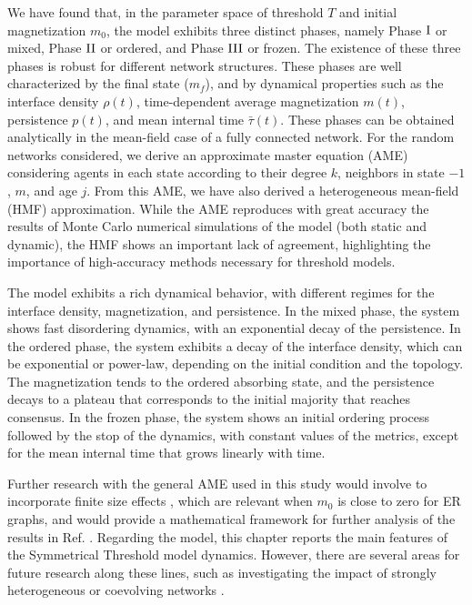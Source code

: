 We have found that, in the parameter space of threshold $T$ and initial magnetization $m_0$, the model exhibits three distinct phases, namely Phase ${\rm I}$ or mixed, Phase ${\rm II}$ or ordered, and Phase ${\rm III}$ or frozen. The existence of these three phases is robust for different network structures.
These phases are well characterized by the final state ($m_f$), and by dynamical properties such as the interface density $\rho(t)$, time-dependent average magnetization $m(t)$, persistence $p(t)$, and mean internal time $\bar{\tau}(t)$. These phases can be obtained analytically in the mean-field case of a fully connected network. For the random networks considered, we derive an approximate master equation (AME) \cite{gleeson-2013} considering agents in each state according to their degree $k$,  neighbors in state $-1$, $m$, and age $j$. From this AME, we have also derived a heterogeneous mean-field (HMF) approximation. While the AME reproduces with great accuracy the results of Monte Carlo numerical simulations of the model (both static and dynamic), the HMF shows an important lack of agreement, highlighting the importance of high-accuracy methods necessary for threshold models.

The model exhibits a rich dynamical behavior, with different regimes for the interface density, magnetization, and persistence. In the mixed phase, the system shows fast disordering dynamics, with an exponential decay of the persistence. In the ordered phase, the system exhibits a decay of the interface density, which can be exponential or power-law, depending on the initial condition and the topology. The magnetization tends to the ordered absorbing state, and the persistence decays to a plateau that corresponds to the initial majority that reaches consensus. In the frozen phase, the system shows an initial ordering process followed by the stop of the dynamics, with constant values of the metrics, except for the mean internal time that grows linearly with time.

Further research with the general AME used in this study would involve to incorporate finite size effects \cite{peralta-2020B}, which are relevant when $m_0$ is close to zero for ER graphs, and would provide a mathematical framework for further analysis of the results in Ref. \cite{Pournaki-2022}. Regarding the model, this chapter reports the main features of the Symmetrical Threshold model dynamics. However, there are several areas for future research along these lines, such as investigating the impact of strongly heterogeneous \cite{barabasi2009scale} or coevolving networks \cite{Zimmermann,vazquez-2008}.